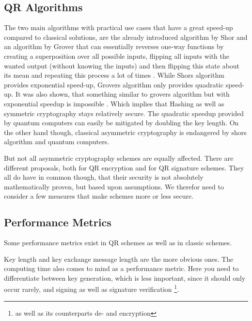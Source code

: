 \documentclass[conference]{IEEEtran}
\newcommand{\comment}[1]{}
\begin{document}
\subsection{QR Algorithms}\label{l:qr-algs}
The two main algorithms with practical use cases that have a great speed-up compared to classical solutions, are the already introduced algorithm by Shor and an algorithm by Grover that can essentially reverses one-way functions by creating a superposition over all possible inputs, flipping all inputs with the wanted output (without knowing the inputs) and then flipping this state about its mean and repeating this process a lot of times \cite{Grover}.
While Shors algorithm provides exponential speed-up, Grovers algorithm only provides quadratic speed-up. It was also shown, that something similar to grovers algorithm but with exponential speedup is impossible \cite{Strengths&Weaknesses_QC}. 
Which implies that Hashing as well as symmetric cryptography stays relatively secure.
The quadratic speedup provided by quantum computers can easily be mitigated by doubling the key length.
On the other hand though, classical asymmetric cryptography is endangered by shors algorithm and quantum computers.

But not all asymmetric cryptography schemes are equally affected.
There are different proposals, both for QR encryption and for QR signature schemes.
They all do have in common though, that their security is not absolutely mathematically proven, but based upon assumptions.
We therefor need to consider a few measures that make schemes more or less secure.
\subsection{Performance Metrics}
\comment{ %
    - Security Level (1-5, AES-128, SHA256, AES-192, SHA384, AES-256) \cite{QR_Iot_Lattice,Energy_comp}([7]) determined via grovers alg
    - no standard benchmark for quantum resistance \cite{QR_comparison} (NIST levels 1-5)
} %

Some performance metrics exist in QR schemes as well as in classic schemes.

Key length and key exchange message length \cite{QR_algs} are the more obvious ones.
The computing time also comes to mind as a performance metric. Here you need to differentiate between key generation, which is less important, since it should only occur rarely, and signing as well as signature verification \footnote{as well as its counterparts de- and encryption}.
\end{document}
